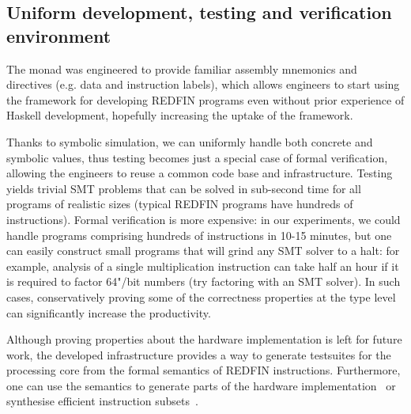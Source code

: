 \subsection{Uniform development, testing and verification environment}

The  monad was engineered to provide familiar assembly mnemonics and
directives (e.g. data and instruction labels), which allows engineers to start
using the framework for developing REDFIN programs even without prior experience
of Haskell development, hopefully increasing the uptake of the framework.

Thanks to symbolic simulation, we can uniformly handle both concrete and
symbolic values, thus testing becomes just a special case of formal verification,
allowing the engineers to reuse a common code base and infrastructure.
Testing yields trivial SMT problems that can be solved in sub-second time for
all programs of realistic sizes (typical REDFIN programs have hundreds of
instructions). Formal verification is more expensive: in our experiments, we
could handle programs comprising hundreds of instructions in 10-15 minutes, but
one can easily construct small programs that will grind any SMT solver to a halt:
for example, analysis of a single multiplication instruction  can take
half an hour if it is required to factor 64"/bit numbers (try factoring
 with an SMT solver). In such cases, conservatively proving
some of the correctness properties at the type level can significantly increase
the productivity.

Although proving properties about the hardware implementation is left for future
work, the developed infrastructure provides a way to generate testsuites for the
processing core from the formal semantics of REDFIN instructions. Furthermore,
one can use the semantics to generate parts of the hardware
implementation~\cite{reid2016cav} or synthesise efficient instruction
subsets~\cite{mokhov2014synthesis}.
